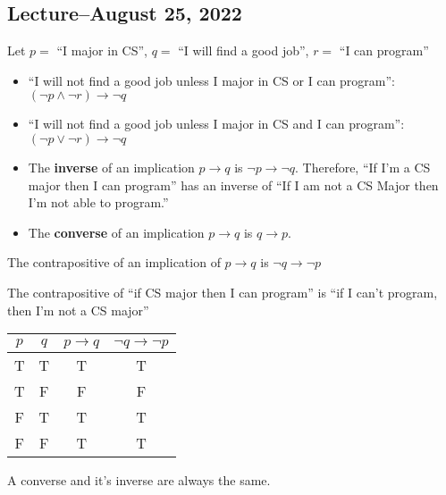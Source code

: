 \documentclass[8pt]{scrreprt}
\begin{document}
\begin{landscape}
\begin{multicols*}{3}
\section{Lecture--August 25, 2022}

Let $p=$ ``I major in CS'', $q=$ ``I will find a good job'', $r=$ ``I can program''

\begin{itemize}

	\item ``I will not find a good job unless I major in CS or I can program'': $(\neg p \land \neg r)\rightarrow \neg q$

	\item ``I will not find a good job unless I major in CS and I can program'': $(\neg p \lor \neg r)\rightarrow \neg q$

	\item The \textbf{inverse} of an implication $p\rightarrow q$ is $\neg p\rightarrow \neg q$.
	      Therefore, ``If I'm a CS major then I can program'' has an inverse of
	      ``If I am not a CS Major then I'm not able to program.''

	\item The \textbf{converse} of an implication $p\rightarrow q$ is $q\rightarrow p$.

\end{itemize}

\begin{definition}[Contrapositive]
	The contrapositive of an implication of $p\rightarrow q$ is $\neg q\rightarrow \neg p$

	The contrapositive of ``if CS major then I can program'' is ``if I can't program, then I'm not a CS major''

	\begin{tabular}{|c|c|c|c|}
		\hline
		$p$ & $q$ & $p\rightarrow q$ & $\neg q\rightarrow \neg p$ \\
		\hline
		T   & T   & T                & T                          \\
		T   & F   & F                & F                          \\
		F   & T   & T                & T                          \\
		F   & F   & T                & T                          \\
		\hline
	\end{tabular}

	A converse and it's inverse are always the same.


\end{definition}
\end{multicols*}
\end{landscape}
\end{document}
